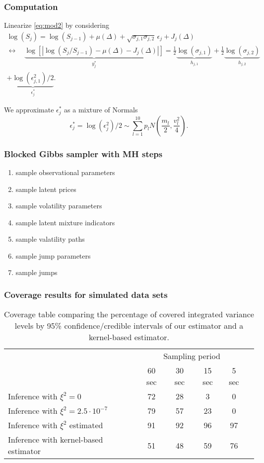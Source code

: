 \documentclass{beamer}
\begin{document}
\begin{frame}
  \frametitle{Computation}
  Linearize \eqref{eq:mod2} by considering 
\begin{multline*}
  \log(S_{j}) = \log(S_{j-1}) + \mu(\Delta) + \sqrt{\sigma_{j,1}\sigma_{j,2}} \, \epsilon_{j} + J_j(\Delta)  \\
  \leftrightarrow \quad \underbrace{ \log\left[ \left| \log(S_{j}/S_{j-1}) - \mu(\Delta) - J_j(\Delta) \right| \right] }_{y_j^*} = \frac{1}{2}\underbrace{  \log(\sigma_{j,1}) }_{h_{j,1}} + \frac{1}{2}\underbrace{  \log(\sigma_{j,2}) }_{h_{j,2}} \\
   + \underbrace{ \log(  \epsilon_{j,1}^2  )/2 }_{\epsilon_{j}^{*}}.
 \end{multline*}

 We approximate $\epsilon^*_{j}$ as a mixture of Normals
\[
	\epsilon^*_{j} = \log( \epsilon_{j}^2 )/2 \sim \sum_{l=1}^{10} p_l N \left( \frac{m_l}{2}, \frac{v_l^2}{4} \right).
\]
\end{frame}
\begin{frame}
  \frametitle{Blocked Gibbs sampler with MH steps}
  \begin{enumerate}
  \item sample observational parameters
  \item sample latent prices
  \item sample volatility parameters
  \item sample latent mixture indicators
  \item sample valatility paths
  \item sample jump parameters
  \item sample jumps
  \end{enumerate}
\end{frame}
\begin{frame}
  \frametitle{Coverage results for simulated data sets}
  \begin{table}[h]
\begin{center}
  \begin{tabular}{|l|ccccc|}
    \hline
    & \multicolumn{4}{c|}{Sampling period} \\
    &   	60 sec 	&   30 sec   &   15 sec & 5 sec  \\ \hline \hline
    Inference with $\xi^2 = 0$   &  72  &   28  &	 3 & 0 \\
    Inference with $\xi^2 = 2.5 \cdot 10^{-7}$ &  79 & 57 & 23 & 0 \\
    Inference with $\xi^2$ estimated & 91 & 92 & 96 & 97  \\ \hline
    Inference with kernel-based estimator &  51 & 48 & 59  & 76 \\
    \hline
\end{tabular}
\caption{Coverage table comparing the percentage of covered integrated variance levels by 95\% confidence/credible intervals of our estimator and a kernel-based estimator.}\label{ta:coverage}
\end{center}
\end{table}
\end{frame}
\end{document}
